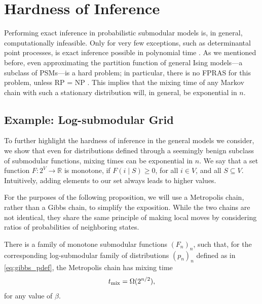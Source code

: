 \section{Hardness of Inference}
Performing exact inference in probabilistic submodular models is, in general, computationally infeasible.
Only for very few exceptions, such as determinantal point processes, is exact inference possible in polynomial time \citep{kulesza12}.
As we mentioned before, even approximating the partition function of general Ising models---a subclass of PSMs---is a hard problem; in particular, there is no FPRAS for this problem, unless RP = NP \citep{jerrum93}.
This implies that the mixing time of any Markov chain with such a stationary distribution will, in general, be exponential in $n$.

\subsection{Example: Log-submodular Grid}
To further highlight the hardness of inference in the general models we consider, we show that even for distributions defined through a seemingly benign subclass of submodular functions, mixing times can be exponential in $n$.
We say that a set function $F : 2^V \to \mathbb{R}$ is monotone, if $F(i \mid S) \geq 0$, for all $i \in V$, and all $S \subseteq V$.
Intuitively, adding elements to our set always leads to higher values.

For the purposes of the following proposition, we will use a Metropolis chain, rather than a Gibbs chain, to simplify the exposition.
While the two chains are not identical, they share the same principle of making local moves by considering ratios of probabilities of neighboring states.
\begin{prop}
There is a family of monotone submodular functions $(F_n)_n$, such that, for the corresponding log-submodular family of distributions $(p_n)_n$ defined as in \eqref{eq:gibbs_pdef}, the Metropolis chain has mixing time
\begin{align*}
  t_{\mathrm{mix}}  = \Omega(2^{n/2}),
\end{align*}
for any value of $\beta$.
\end{prop}

